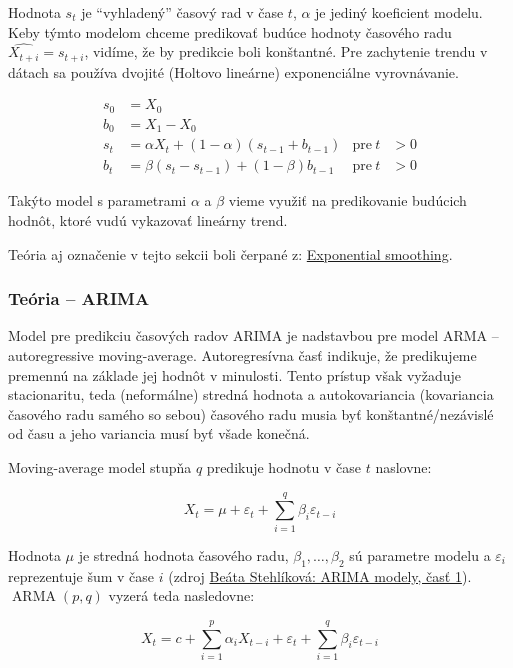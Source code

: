 \documentclass[main.tex]{subfiles}
\begin{document}
Hodnota $s_t$ je \enquote{vyhladený} časový rad v čase $t$, $\alpha$ je jediný koeficient modelu. Keby týmto modelom chceme predikovať budúce hodnoty časového radu $\widehat{X_{t+i}} = s_{t+i}$, vidíme, že by predikcie boli konštantné. Pre zachytenie trendu v dátach sa používa dvojité (Holtovo lineárne) exponenciálne vyrovnávanie.

\begin{align*}
	s_0 &= X_0 \\
	b_0 &= X_1 - X_0 \\
	s_t &= \alpha X_t + (1-\alpha) (s_{t-1} + b_{t-1}) & \text{pre}~t&>0 \\
	b_t &= \beta (s_t - s_{t-1}) + (1-\beta)b_{t-1} & \text{pre}~t&>0 
\end{align*}

Takýto model s parametrami $\alpha$ a $\beta$ vieme využiť na predikovanie budúcich hodnôt, ktoré vudú vykazovať lineárny trend.

Teória aj označenie v tejto sekcii boli čerpané z: \href{https://en.wikipedia.org/wiki/Exponential_smoothing#}{Exponential smoothing}.

\subsubsection{Teória -- ARIMA} 

Model pre predikciu časových radov ARIMA je nadstavbou pre model ARMA -- autoregressive moving-average. Autoregresívna časť indikuje, že predikujeme premennú na základe jej hodnôt v minulosti. Tento prístup však vyžaduje stacionaritu, teda (neformálne) stredná hodnota a autokovariancia (kovariancia časového radu samého so sebou) časového radu musia byť konštantné/nezávislé od času a jeho variancia musí byť všade konečná. 

Moving-average model stupňa $q$ predikuje hodnotu v čase $t$ naslovne:

\begin{equation*}
	X_t = \mu + \varepsilon_t + \sum_{i=1}^{q}\beta_i\varepsilon_{t-i}
\end{equation*}

Hodnota $\mu$ je stredná hodnota časového radu, $\beta_1,\dots, \beta_2$ sú parametre modelu a $\varepsilon_i$ reprezentuje šum v čase $i$ (zdroj \href{http://www.iam.fmph.uniba.sk/institute/stehlikova/cr19/arima1.html#maq-proces-vyssieho-radu}{Beáta Stehlíková: ARIMA modely, časť 1}). $\operatorname{ARMA}(p, q)$ vyzerá teda nasledovne:

\begin{equation*}
	X_t = c + \sum_{i=1}^{p}\alpha_i X_{t-i} + \varepsilon_t + \sum_{i=1}^{q}\beta_i\varepsilon_{t-i}
\end{equation*}
\end{document}
